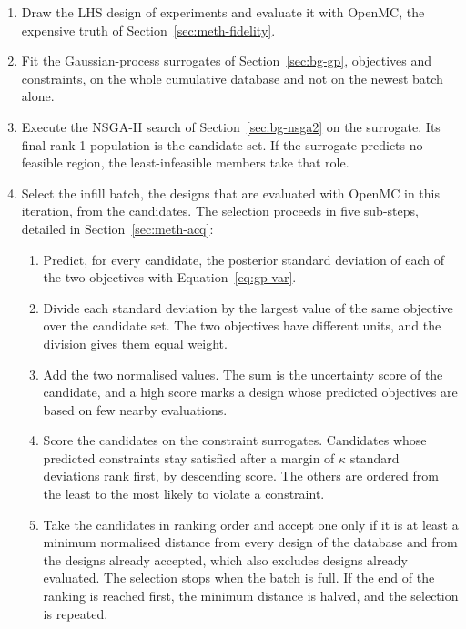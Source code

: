 \begin{enumerate}
  \item Draw the LHS design of experiments and evaluate it with OpenMC,
        the expensive truth of Section~\ref{sec:meth-fidelity}.

  \item Fit the Gaussian-process surrogates of
        Section~\ref{sec:bg-gp}, objectives and constraints, on the
        whole cumulative database and not on the newest batch alone.

  \item Execute the NSGA-II search of Section~\ref{sec:bg-nsga2} on the
        surrogate. Its final rank-1 population is the candidate set.
        If the surrogate predicts no feasible region, the
        least-infeasible members take that role.

  \item Select the infill batch, the designs that are evaluated with
        OpenMC in this iteration, from the candidates. The selection
        proceeds in five sub-steps, detailed in
        Section~\ref{sec:meth-acq}:
        \begin{enumerate}[label=\arabic{enumi}.\arabic*]
          \item Predict, for every candidate, the posterior standard
                deviation of each of the two objectives with
                Equation~\eqref{eq:gp-var}.

          \item Divide each standard deviation by the largest value of
                the same objective over the candidate set. The two
                objectives have different units, and the division gives
                them equal weight.

          \item Add the two normalised values. The sum is the
                uncertainty score of the candidate, and a high score
                marks a design whose predicted objectives are based on few nearby evaluations.

          \item Score the candidates on the constraint surrogates.
                Candidates whose predicted constraints stay satisfied
                after a margin of $\kappa$ standard deviations rank first,
                by descending score. The others are ordered from the least to
                the most likely to violate a constraint.

          \item Take the candidates in ranking order and accept one only if it
                is at least a minimum normalised distance from every design of the database and from the designs already
                accepted, which also excludes designs already evaluated.
                The selection stops when the batch is full. If the end of the ranking is reached first, the minimum distance is halved, and the selection is
                repeated.
        \end{enumerate}


\end{enumerate}
